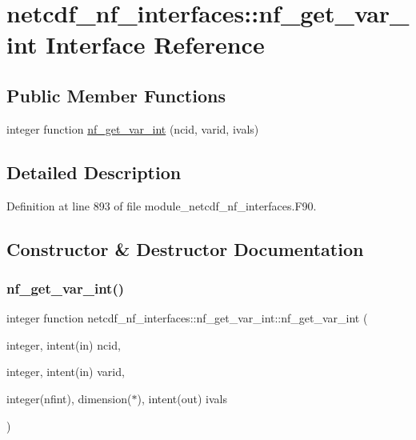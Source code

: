 \hypertarget{interfacenetcdf__nf__interfaces_1_1nf__get__var__int}{}\section{netcdf\+\_\+nf\+\_\+interfaces\+:\+:nf\+\_\+get\+\_\+var\+\_\+int Interface Reference}
\label{interfacenetcdf__nf__interfaces_1_1nf__get__var__int}
\subsection*{Public Member Functions}
\begin{DoxyCompactItemize}
\item 
integer function \hyperlink{interfacenetcdf__nf__interfaces_1_1nf__get__var__int_a62ff447e24f433d88c0bd5094d2de157}{nf\+\_\+get\+\_\+var\+\_\+int} (ncid, varid, ivals)
\end{DoxyCompactItemize}


\subsection{Detailed Description}


Definition at line 893 of file module\+\_\+netcdf\+\_\+nf\+\_\+interfaces.\+F90.



\subsection{Constructor \& Destructor Documentation}
\mbox{\label{interfacenetcdf__nf__interfaces_1_1nf__get__var__int_a62ff447e24f433d88c0bd5094d2de157}} 
\subsubsection{\texorpdfstring{nf\+\_\+get\+\_\+var\+\_\+int()}{nf\_get\_var\_int()}}
{\footnotesize\ttfamily integer function netcdf\+\_\+nf\+\_\+interfaces\+::nf\+\_\+get\+\_\+var\+\_\+int\+::nf\+\_\+get\+\_\+var\+\_\+int (\begin{DoxyParamCaption}\item[{integer, intent(in)}]{ncid,  }\item[{integer, intent(in)}]{varid,  }\item[{integer(nfint), dimension($\ast$), intent(out)}]{ivals }\end{DoxyParamCaption})}



